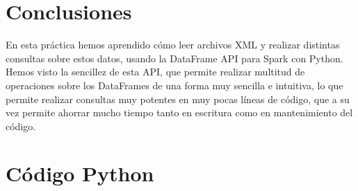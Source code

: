 \documentclass[12pt,a4paper,twoside,openright,titlepage,final]{article}
\begin{document}
\section{Conclusiones}

En esta práctica hemos aprendido cómo leer archivos XML y realizar distintas consultas sobre estos datos, usando la DataFrame API para Spark con Python. Hemos visto la sencillez de esta API, que permite realizar multitud de operaciones sobre los DataFrames de una forma muy sencilla e intuitiva, lo que permite realizar consultas muy potentes en muy pocas líneas de código, que a su vez permite ahorrar mucho tiempo tanto en escritura como en mantenimiento del código.

\newpage

\section{Código Python}

\begin{verbatim}

\end{verbatim}
\end{document}
